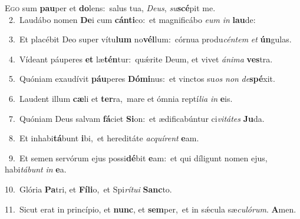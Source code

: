 \lettrine{\initial\textcolor{\initialcolor}{E}}{go} sum \textbf{pau}\-per et \textbf{do}\-lens:~\star salus tua, \textit{De}\-\textit{us}, \textit{su}\-\textbf{scé}pit me.\\
{\numbfont\textcolor{\numbcolor}{~2.}}~Laudábo nomen \textbf{De}\-i cum \textbf{cán}\-\textbf{ti}co:~\star et magnificábo \textit{e}\-\textit{um} \textit{in} \textbf{lau}\-de:\par
{\numbfont\textcolor{\numbcolor}{~3.}}~Et placébit Deo super vítu\textbf{lum} no\-\textbf{vél}\-lum:~\star córnua produ\-\textit{cén}\-\textit{tem} \textit{et} \textbf{ún}\-gulas.\par
{\numbfont\textcolor{\numbcolor}{~4.}}~Vídeant páuperes \textbf{et} læ\-\textbf{tén}\-tur:~\star quǽrite Deum, et vivet \textit{á}\-\textit{ni}\textit{ma} \textbf{ves}\-tra.\par
{\numbfont\textcolor{\numbcolor}{~5.}}~Quóniam exaudívit \textbf{páu}\-peres \textbf{Dó}\-\textbf{mi}nus:~\star et vinctos su\textit{os} \textit{non} \textit{de}\-\textbf{spé}xit.\par
{\numbfont\textcolor{\numbcolor}{~6.}}~Laudent illum \textbf{cæ}\-li et \textbf{ter}\-ra,~\star mare et ómnia reptí\-\textit{li}\-\textit{a} \textit{in} \textbf{e}\-is.\par
{\numbfont\textcolor{\numbcolor}{~7.}}~Quóniam Deus salvam \textbf{fá}\-ciet \textbf{Si}\-on:~\star et ædificabúntur ci\-\textit{vi}\-\textit{tá}\textit{tes} \textbf{Ju}\-da.\par
{\numbfont\textcolor{\numbcolor}{~8.}}~Et inhabi\-\textbf{tá}\-bunt \textbf{i}\-bi,~\star et hereditáte \textit{ac}\-\textit{quí}\textit{rent} \textbf{e}\-am.\par
{\numbfont\textcolor{\numbcolor}{~9.}}~Et semen servórum ejus possi\-\textbf{dé}\-bit \textbf{e}\-am:~\star et qui díligunt nomen ejus, habi\-\textit{tá}\-\textit{bunt} \textit{in} \textbf{e}\-a.\par
{\numbfont\textcolor{\numbcolor}{10.}}~Glória \textbf{Pa}\-tri, et \textbf{Fí}\-\textbf{li}o,~\star et Spi\-\textit{rí}\-\textit{tu}\textit{i} \textbf{Sanc}\-to.\par
{\numbfont\textcolor{\numbcolor}{11.}}~Sicut erat in princípio, et \textbf{nunc}\-, et \textbf{sem}\-per,~\star et in sǽcula sæ\-\textit{cu}\-\textit{ló}\textit{rum}. \textbf{A}\-men.\par
